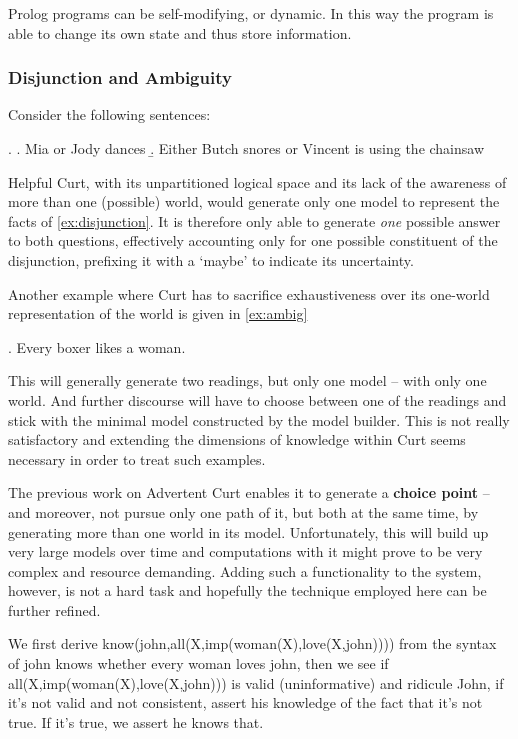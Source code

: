 \documentclass[notitlepage,twoside,a4paper]{scrreprt}
\newcommand{\term}[1]{\textsf{\textbf{#1}}} %
\newcommand{\pn}{\textsf} %
\newcommand{\curt}{\pn{Curt}}
\newcommand{\acurt}{\pn{Advertent Curt}}
\newcommand{\prol}{\pn{Prolog}}
\theoremstyle{remark}
\theoremstyle{remark}
\theoremstyle{definition}
\theoremstyle{definition}
\begin{document}
\prol{} programs can be self-modifying, or dynamic. In this way the program is
able to change its own state and thus store information.

\subsubsection{Disjunction and Ambiguity}
Consider the following sentences:

\ex. \label{ex:disjunction} \a. Mia or Jody dances
\b. Either Butch snores or Vincent is using the chainsaw

\pn{Helpful Curt}, with its unpartitioned logical space and its lack of
the awareness of more than one (possible) world, would generate only one model
to represent the facts of \ref{ex:disjunction}. It is therefore only able to
generate \emph{one} possible answer to both questions, effectively accounting only
for one possible constituent of the disjunction, prefixing it with a `maybe' to
indicate its uncertainty.

Another example where \curt{} has to sacrifice exhaustiveness over its one-world
representation of the world is given in \ref{ex:ambig}

\ex.\label{ex:ambig} Every boxer likes a woman.

This will generally generate two readings, but only one model -- with only one
world. And further discourse will have to choose between one of the readings and
stick with the minimal model constructed by the model builder. This is not
really satisfactory and extending the dimensions of knowledge within \curt{} seems
necessary in order to treat such examples.

The previous work on \acurt{} enables it to generate a \term{choice point} -- and
moreover, not pursue only one path of it, but both at the same time, by
generating more than one world in its model.
Unfortunately, this will build up very large models over time and computations
with it might prove to be very complex and resource demanding. Adding such a
functionality to the system, however, is not a hard task and hopefully the
technique employed here can be further refined. %

We first derive know(john,all(X,imp(woman(X),love(X,john)))) from the syntax of
john knows whether every woman loves john, then we see if
all(X,imp(woman(X),love(X,john))) is valid (uninformative) and ridicule John, if
it's not valid and not consistent, assert his knowledge of the fact that it's
not true. If it's true, we assert he knows that.
\end{document}
